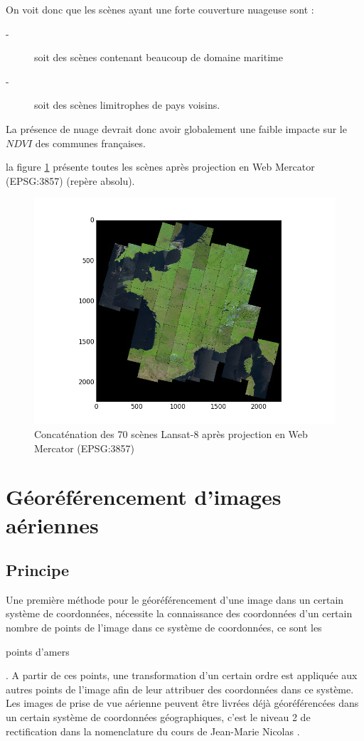 \documentclass{book}
\begin{document}
On voit donc que les scènes ayant une forte couverture nuageuse sont :
\begin{description}
\item[-] soit des scènes contenant beaucoup de domaine maritime
\item[-] soit des scènes limitrophes de pays voisins. 
\end{description}
La présence de nuage devrait donc avoir globalement une faible impacte sur le $NDVI$ des communes françaises.
\clearpage

la figure \ref{couverture} présente toutes les scènes après projection en Web Mercator (EPSG:3857) (repère absolu).

\begin{figure}[H]
\begin{center}
\includegraphics[scale=0.7]{images/france-covering.png}
\end{center}
\caption{Concaténation des 70 scènes Lansat-8 après projection en Web Mercator (EPSG:3857)}
\label{couverture}
\end{figure}


\chapter{Géoréférencement d'images aériennes}
\section{Principe}\label{principe_geo}

Une première méthode pour le géoréférencement d'une image dans un certain système de coordonnées, nécessite la connaissance 
des coordonnées d'un 
certain nombre de points de l'image dans ce système de coordonnées, ce sont les \begin{itshape}points d'amers\end{itshape}.
A partir de ces points, une transformation d'un certain ordre est appliquée aux autres points de l'image afin de leur attribuer 
des coordonnées dans ce système.\\
Les images de prise de vue aérienne peuvent être livrées déjà géoréférencées dans un certain système de coordonnées géographiques, 
c'est le niveau 2 de rectification dans la nomenclature du cours de Jean-Marie Nicolas \cite{Nicolas:2014}.\\
\end{document}
